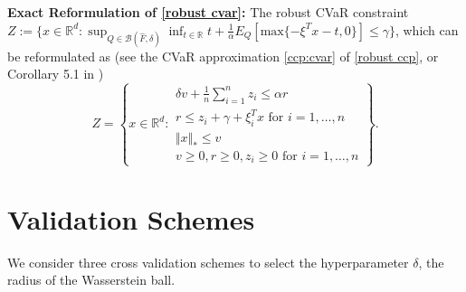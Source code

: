 \documentclass[11pt]{article}
\newcommand{\R}{\mathbb{R}}
\begin{document}
\textbf{Exact Reformulation of \eqref{robust cvar}: }The robust CVaR constraint $Z:=\{x\in\R^d:\sup_{Q\in\mathcal B(\hat F,\delta)} \inf_{t\in\R}t+\frac{1}{\alpha}E_Q[\text{max}\{-\xi^Tx-t,0\}]\leq \gamma\}$, which can be reformulated as (see the CVaR approximation \eqref{ccp:cvar} of \eqref{robust ccp}, or Corollary 5.1 in \cite{esfahani2018data})
\begin{equation}\label{cvar:reformulation}
Z=\left\{x\in\R^d:\begin{array}{l}
\delta v+ \frac{1}{n}\sum_{i=1}^nz_i\leq \alpha r\\
r\leq z_i+\gamma+\xi_i^Tx\text{ for }i=1,\ldots,n\\
\Vert x\Vert_*\leq v\\
v\geq 0,r\geq 0,z_i\geq 0\text{ for }i=1,\ldots,n
\end{array}\right\}.
\end{equation}



\section{Validation Schemes}
We consider three cross validation schemes to select the hyperparameter $\delta$, the radius of the Wasserstein ball.
\end{document}
